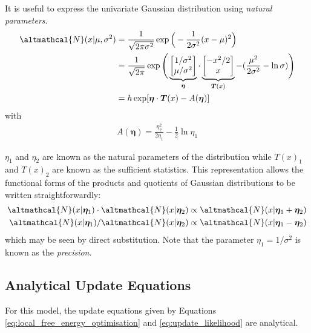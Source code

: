 It is useful to express the univariate Gaussian distribution using \emph{natural parameters}. 
\begin{align}
\altmathcal{N}(x| \mu, \sigma^2) &= \frac{1}{\sqrt{2\pi \sigma^2}} \exp \Big(-\frac{1}{2\sigma^2}(x - \mu)^2 \Big) \nonumber\\
&= \frac{1}{\sqrt{2\pi}} \exp \Bigg( \underbrace{\begin{bmatrix}
1/\sigma^2 \\ \mu/\sigma^2
\end{bmatrix}}_{\bm{\eta}}\cdot \underbrace{\begin{bmatrix}
-x^2/{2} \\ x
\end{bmatrix}}_{\bm{T}(x)}  - (\frac{\mu^2}{2\sigma^2} - \ln \sigma) \Bigg) \nonumber \\
&= h \exp [\bm{\eta} \cdot \bm{T}(x) - A(\bm{\eta})]
\end{align}
with
\begin{align}
A(\bm{\eta}) = \frac{\eta_2^2}{2\eta_1} - \frac{1}{2}\ln \eta_1
\end{align}

$\eta_1$ and $\eta_2$ are known as the natural parameters of the distribution while $T(x)_1$ and $T(x)_2$ are known as the sufficient statistics. This representation allows the functional forms of the products and quotients of Gaussian distributions to be written straightforwardly:
\begin{align}
\altmathcal{N}(x| \bm{\eta}_1 ) \cdot \altmathcal{N}(x| \bm{\eta}_2) &\propto \altmathcal{N}(x| \bm{\eta}_1 + \bm{\eta}_2) \\
\altmathcal{N}(x| \bm{\eta}_1 ) /  \altmathcal{N}(x| \bm{\eta}_2) &\propto \altmathcal{N}(x| \bm{\eta}_1 - \bm{\eta}_2)
\end{align}
which may be seen by direct substitution. Note that the parameter $\eta_1 = 1/\sigma^2$ is known as the \emph{precision}. 

\subsection{Analytical Update Equations}
For this model, the update equations given by Equations \eqref{eq:local_free_energy_optimisation} and \eqref{eq:update_likelihood} are analytical.

